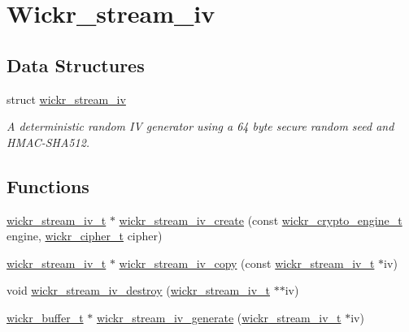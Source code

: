 \hypertarget{group__wickr__stream__iv}{}\section{Wickr\+\_\+stream\+\_\+iv}
\label{group__wickr__stream__iv}
\subsection*{Data Structures}
\begin{DoxyCompactItemize}
\item 
struct \hyperlink{structwickr__stream__iv}{wickr\+\_\+stream\+\_\+iv}
\begin{DoxyCompactList}\small\item\em A deterministic random IV generator using a 64 byte secure random seed and H\+M\+A\+C-\/\+S\+H\+A512. \end{DoxyCompactList}\end{DoxyCompactItemize}
\subsection*{Functions}
\begin{DoxyCompactItemize}
\item 
\hyperlink{structwickr__stream__iv}{wickr\+\_\+stream\+\_\+iv\+\_\+t} $\ast$ \hyperlink{group__wickr__stream__iv_gaaad5726a228b7866b0cb392c131f95be}{wickr\+\_\+stream\+\_\+iv\+\_\+create} (const \hyperlink{structwickr__crypto__engine}{wickr\+\_\+crypto\+\_\+engine\+\_\+t} engine, \hyperlink{structwickr__cipher}{wickr\+\_\+cipher\+\_\+t} cipher)
\item 
\hyperlink{structwickr__stream__iv}{wickr\+\_\+stream\+\_\+iv\+\_\+t} $\ast$ \hyperlink{group__wickr__stream__iv_gaec8a5b5d70a86997c8158d047c7eed34}{wickr\+\_\+stream\+\_\+iv\+\_\+copy} (const \hyperlink{structwickr__stream__iv}{wickr\+\_\+stream\+\_\+iv\+\_\+t} $\ast$iv)
\item 
void \hyperlink{group__wickr__stream__iv_gad6ac87d891822a866a0d7cad48f79e27}{wickr\+\_\+stream\+\_\+iv\+\_\+destroy} (\hyperlink{structwickr__stream__iv}{wickr\+\_\+stream\+\_\+iv\+\_\+t} $\ast$$\ast$iv)
\item 
\hyperlink{structwickr__buffer}{wickr\+\_\+buffer\+\_\+t} $\ast$ \hyperlink{group__wickr__stream__iv_gaddcfdc9904ec0ffd32ce8f988aefc484}{wickr\+\_\+stream\+\_\+iv\+\_\+generate} (\hyperlink{structwickr__stream__iv}{wickr\+\_\+stream\+\_\+iv\+\_\+t} $\ast$iv)
\end{DoxyCompactItemize}


